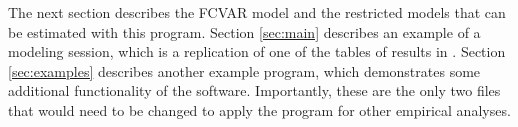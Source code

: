 \documentclass[article]{jss}
\begin{document}


The next section describes the FCVAR model and the restricted models that can be estimated with this program. Section \ref{sec:main} describes an example of a modeling session, which is a replication of one of the tables of results in \cite{JNP2014}. Section \ref{sec:examples} describes another example program, which demonstrates some additional functionality of the software. Importantly, these are the only two files that would need to be changed to apply the program for other empirical analyses. 


\end{document}
